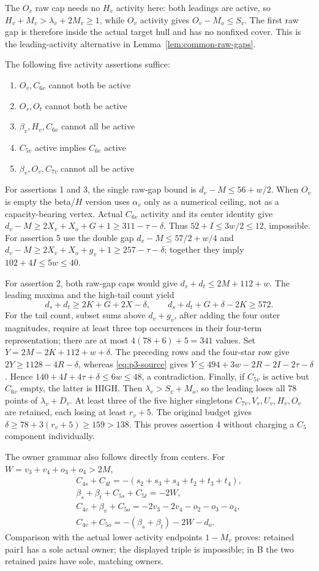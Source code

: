 \documentclass[11pt,letterpaper]{article}
\theoremstyle{definition}\newtheorem{definition}[theorem]{Definition}
\begin{document}
The $O_v$ raw cap needs no $H_v$ activity here: both leadings are active, so $H_v+M_v>\lambda_v+2M_v\ge1$, while $O_v$ activity gives $O_v-M_o\le S_v$. The first raw gap is therefore inside the actual target hull and has no nonfixed cover. This is the leading-activity alternative in Lemma~\ref{lem:common-raw-gaps}.

The following five activity assertions suffice:
\begin{enumerate}
\item $O_v,C_{6v}$ cannot both be active
\item $O_s,O_t$ cannot both be active
\item $\beta_v,H_v,C_{6v}$ cannot all be active
\item $C_{5v}$ active implies $C_{6v}$ active
\item $\beta_v,O_v,C_{7v}$ cannot all be active
\end{enumerate}
For assertions 1 and 3, the single raw-gap bound is
$d_v-M\le56+w/2$. When $O_v$ is empty the beta/$H$ version uses
$\alpha_v$ only as a numerical ceiling, not as a capacity-bearing vertex.
Actual $C_{6v}$ activity and its center identity give
$d_v-M\ge2X_v+X_o+G+1\ge311-\tau-\delta$.
Thus $52+I\le3w/2\le12$, impossible.
For assertion 5 use the double gap
$d_v-M\le57/2+w/4$ and
$d_v-M\ge2X_v+X_o+g_v+1\ge257-\tau-\delta$;
together they imply $102+4I\le5w\le40$.

For assertion 2, both raw-gap caps would give
$d_s+d_t\le2M+112+w$. The leading maxima and the high-tail count yield
\[
d_s+d_t\ge2K+G+2X-\delta,\qquad
 d_s+d_t+G+\delta-2K\ge572.
\]
For the tail count, subset sums above $d_v+g_v$, after adding the four
outer magnitudes, require at least three top occurrences in their
four-term representation; there are at most $4(78+6)+5=341$ values.
Set $Y=2M-2K+112+w+\delta$. The preceding rows and the four-star row give
$2Y\ge1128-4R-\delta$, whereas \eqref{eq:p3-source} gives
$Y\le494+3w-2R-2I-2\tau-\delta$. Hence
$140+4I+4\tau+\delta\le6w\le48$, a contradiction.
Finally, if $C_{5v}$ is active but $C_{6v}$ empty, the latter is HIGH.
Then $\lambda_v>S_v+M_o$, so the leading loses all 78 points of
$\lambda_v+D_v$. At least three of the five higher singletons
$C_{7v},V_v,U_v,H_v,O_v$ are retained, each losing at least $r_v+5$.
The original budget gives $\delta\ge78+3(r_v+5)\ge159>138$.
This proves assertion 4 without charging a $C_5$ component individually.

The owner grammar also follows directly from centers. For
$W=v_3+v_4+o_3+o_4>2M$,
\[
\begin{gathered}
C_{4s}+C_{4t}=-(s_2+s_3+s_4+t_2+t_3+t_4),\\
\beta_s+\beta_t+C_{5s}+C_{5t}=-2W,\\
C_{4v}+\beta_v+C_{5o}=-2v_3-2v_4-o_2-o_3-o_4,\\
C_{4v}+C_{5o}=-(\beta_s+\beta_t)-2W-d_o.
\end{gathered}
\]
Comparison with the actual lower activity endpoints $1-M_v$ proves:
retained pair1 has a sole actual owner; the displayed triple is
impossible; in B the two retained pairs have sole, matching owners.
\end{document}
